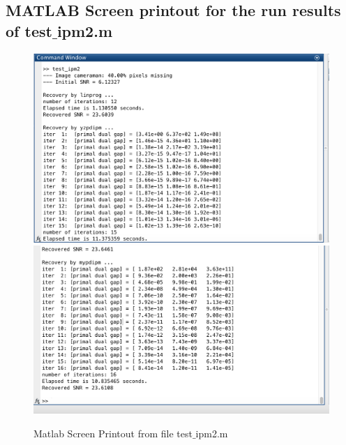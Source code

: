 \subsection*{MATLAB Screen printout for the run results of test$\_$ipm2.m}
\begin{figure}[H]
\centering
\includegraphics[width=15cm]{f_18}
\includegraphics[width=15cm]{f_19}
\caption{Matlab Screen Printout from file test$\_$ipm2.m}
\end{figure}
\clearpage

